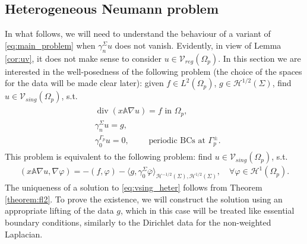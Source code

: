 \documentclass[report]{elsarticle}
\newtheorem{remark}[theorem]{Remark}
\numberwithin{theorem}{section}
\newcommand{\bx}{\mathbf{x}}
\begin{document}
\subsection{Heterogeneous Neumann problem}
\label{sec:heterog_neumann}
In what follows, we will need to understand the behaviour of a variant of \eqref{eq:main_problem}  when  $\gamma_{n}^{\Sigma}u$ does not vanish. Evidently, in view of Lemma \ref{cor:uv}, it does not make sense to consider $u\in \mathcal{V}_{reg}(\Omega_p)$. In this section we are interested in the well-posedness of the following problem (the choice of the spaces for the data will be made clear later): given $f\in L^2(\Omega_p)$, $g\in \mathcal{H}^{1/2}(\Sigma)$, find $u\in \mathcal{V}_{sing}(\Omega_p)$, s.t. 
\begin{align}
	\label{eq:vsing_heter}
	\tag{N}
	\begin{split}
		&\operatorname{div}( x \mathbb{A}\nabla u)=f \text{ in }\Omega_p, \\ &\gamma_{n}^{\Sigma}u=g,\\
		&\gamma_{0}^{\Gamma_p}u=0, \qquad  \text{ periodic BCs at }\Gamma_p^{\pm}.
	\end{split}
\end{align}
This problem is equivalent to the following problem: find $u\in \mathcal{V}_{sing}(\Omega_p)$, s.t. 
\begin{align*}
	( x \mathbb{A}\nabla u, \nabla \varphi)=-(f, \varphi)-\langle g, \gamma_0^{\Sigma}\overline{\varphi}\rangle_{\mathcal{H}^{-1/2}(\Sigma), \mathcal{H}^{1/2}(\Sigma)}, \quad \forall \varphi \in \mathcal{H}^1(\Omega_p).
\end{align*}
The uniqueness of a solution to \eqref{eq:vsing_heter} follows from Theorem \ref{theorem:fl2}. To prove the existence, we will construct the solution using an appropriate lifting of the data $g$, which in this case will be treated like essential boundary conditions, similarly to the Dirichlet data for the non-weighted Laplacian. 
\end{document}

